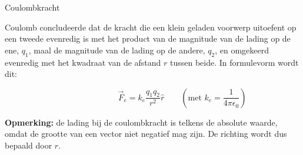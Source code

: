 \begin{theo}[Coulombkracht]{Coulombkracht}

    Coulomb concludeerde dat de kracht die een klein geladen voorwerp uitoefent op een tweede evenredig is met het product van de magnitude van de lading op de ene, $ q_1 $, maal de magnitude van de lading op de andere, $ q_2 $, en omgekeerd evenredig met het kwadraat van de afstand $ r $ tussen beide. In formulevorm wordt dit:
    
    \begin{equation*}
        \hspace{3cm} \Vec{F}_{e} = k_e\dfrac{q_1q_2}{r^2}\hat{r} \quad \quad (\text{met } k_e = \dfrac{1} {4\pi\epsilon_0})
    \end{equation*}
    
    

    \noindent \textbf{Opmerking:} de lading bij de coulombkracht is telkens de absolute waarde, omdat de grootte van een vector niet negatief mag zijn. De richting wordt dus bepaald door $\hat{r}$.
\end{theo}

